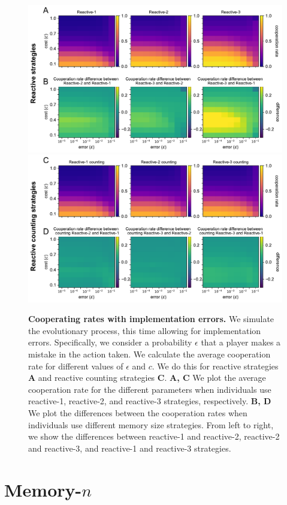 \documentclass[11pt]{article}
\theoremstyle{plainCl1}
\theoremstyle{plainCl2}
\begin{document}
\begin{figure}[h]
    \centering
    \includegraphics[width=.65\textwidth]{../../figures/siFig2Errors.pdf} \\[2em]
    \includegraphics[width=.65\textwidth]{../../figures/siFigErrorsCounting.pdf}
    \caption{
    \textbf{Cooperating rates with implementation errors.}
  We simulate the evolutionary process, this time allowing for implementation
  errors. Specifically, we consider a probability \(\epsilon\) that a player makes
  a mistake in the action taken. We calculate the average cooperation rate for
  different values of \(\epsilon\) and \(c\). We do this for reactive strategies
  {\bf A} and reactive counting strategies {\bf C}. {\bf A, C} We plot the average
  cooperation rate for the different parameters when individuals use reactive-1,
  reactive-2, and reactive-3 strategies, respectively. {\bf B, D} We plot the
  differences between the cooperation rates when individuals use different memory
  size strategies. From left to right, we show the differences between reactive-1
  and reactive-2, reactive-2 and reactive-3, and reactive-1 and reactive-3
  strategies.
    }\label{fig:errors}
\end{figure}




\newpage

\section{Memory-$n$}
\end{document}
